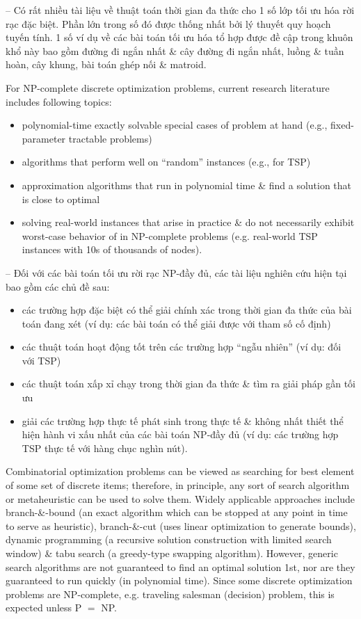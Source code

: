 \documentclass{article}
\begin{document}
-- Có rất nhiều tài liệu về thuật toán thời gian đa thức cho 1 số lớp tối ưu hóa rời rạc đặc biệt. Phần lớn trong số đó được thống nhất bởi lý thuyết quy hoạch tuyến tính. 1 số ví dụ về các bài toán tối ưu hóa tổ hợp được đề cập trong khuôn khổ này bao gồm đường đi ngắn nhất \& cây đường đi ngắn nhất, luồng \& tuần hoàn, cây khung, bài toán ghép nối \& matroid.

For NP-complete discrete optimization problems, current research literature includes following topics:
\begin{itemize}
    \item polynomial-time exactly solvable special cases of problem at hand (e.g., fixed-parameter tractable problems)
    \item algorithms that perform well on ``random'' instances (e.g., for TSP)
    \item approximation algorithms that run in polynomial time \& find a solution that is close to optimal
    \item solving real-world instances that arise in practice \& do not necessarily exhibit worst-case behavior of in NP-complete problems (e.g. real-world TSP instances with 10s of thousands of nodes).
\end{itemize}
-- Đối với các bài toán tối ưu rời rạc NP-đầy đủ, các tài liệu nghiên cứu hiện tại bao gồm các chủ đề sau:
\begin{itemize}
    \item các trường hợp đặc biệt có thể giải chính xác trong thời gian đa thức của bài toán đang xét (ví dụ: các bài toán có thể giải được với tham số cố định)
    \item các thuật toán hoạt động tốt trên các trường hợp ``ngẫu nhiên'' (ví dụ: đối với TSP)
    \item các thuật toán xấp xỉ chạy trong thời gian đa thức \& tìm ra giải pháp gần tối ưu
    \item giải các trường hợp thực tế phát sinh trong thực tế \& không nhất thiết thể hiện hành vi xấu nhất của các bài toán NP-đầy đủ (ví dụ: các trường hợp TSP thực tế với hàng chục nghìn nút).
\end{itemize}
Combinatorial optimization problems can be viewed as searching for best element of some set of discrete items; therefore, in principle, any sort of search algorithm or metaheuristic can be used to solve them. Widely applicable approaches include branch-\&-bound (an exact algorithm which can be stopped at any point in time to serve as heuristic), branch-\&-cut (uses linear optimization to generate bounds), dynamic programming (a recursive solution construction with limited search window) \& tabu search (a greedy-type swapping algorithm). However, generic search algorithms are not guaranteed to find an optimal solution 1st, nor are they guaranteed to run quickly (in polynomial time). Since some discrete optimization problems are NP-complete, e.g. traveling salesman (decision) problem, this is expected unless P $=$ NP.
\end{document}

